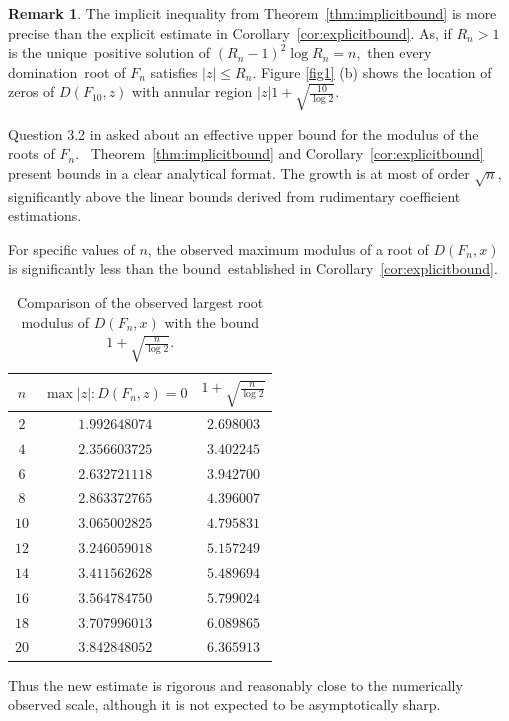 \documentclass[12pt]{article}
\theoremstyle{definition}
\newtheorem{remark}[theorem]{Remark}
\begin{document}
	\begin{remark}
		The implicit inequality from Theorem~\ref{thm:implicitbound} is more precise than the explicit estimate in Corollary~\ref{cor:explicitbound}. As, if $R_n>1$ is the unique positive solution of $ (R_n-1)^2\log R_n=n, $ then every domination root of $F_n$ satisfies $|z|\le R_n.$ Figure \ref{fig1} (b) shows the location of zeros of $D(F_{10},z)$ with annular region $|z|1+\sqrt{\frac{10}{\log 2}}.$
	\end{remark}
	
	 Question 3.2 in \cite{AlikhaniBrownJahari2016} asked about an effective upper bound for the modulus of the roots of \( F_n \).  Theorem~\ref{thm:implicitbound} and Corollary~\ref{cor:explicitbound} present bounds in a clear analytical format. The growth is at most of order $\sqrt n$, significantly above the linear bounds derived from rudimentary coefficient estimations.
	
	 	For specific values of $n$, the observed maximum modulus of a root of $D(F_n,x)$ is significantly less than the bound established in Corollary~\ref{cor:explicitbound}.		
		 \begin{table}[H]
		 	\centering
		 	\caption{Comparison of the observed largest root modulus of $D(F_n,x)$ with the bound $1+\sqrt{\tfrac{n}{\log 2}}$.}
		 	\label{tab:modulusbound}
				\begin{tabular}{ccc}
				\toprule
				$n$ & $\max{|z|: D(F_n,z)=0}$ & $1+\sqrt{\tfrac{n}{\log 2}}$ \\
				\midrule
				$2$  & $1.992648074$ & $2.698003$ \\
				$4$  & $2.356603725$ & $3.402245$ \\
				$6$  & $2.632721118$ & $3.942700$ \\
				$8$  & $2.863372765$ & $4.396007$ \\
				$10$ & $3.065002825$ & $4.795831$ \\
				$12$ & $3.246059018$ & $5.157249$ \\
				$14$ & $3.411562628$ & $5.489694$ \\
				$16$ & $3.564784750$ & $5.799024$ \\
				$18$ & $3.707996013$ & $6.089865$ \\
				$20$ & $3.842848052$ & $6.365913$ \\
				\bottomrule
			\end{tabular}
			\end{table} 
			
			
		
		Thus the new estimate is rigorous and reasonably close to the numerically observed scale, although it is not expected to be asymptotically sharp. 
	
\end{document}
